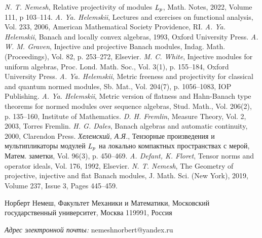 \documentclass[12pt]{article}
\begin{document}
\begin{thebibliography}{999}
    \textit{N. T. Nemesh}, Relative projectivity of 
    modules $\it{L_p}$, Math. Notes, 2022, Volume 111, p 103--114.
    \textit{A. Ya. Helemskii}, Lectures and 
    exercises on functional analysis, Vol. 233, {2006}, 
    American Mathematical Society Providence, RI.
    \textit{A. Ya. Helemskii}, Banach and locally 
    convex algebras, {1993}, Oxford University Press.
    \textit{A. W. M. Graven}, Injective and 
    projective Banach modules, Indag. Math. (Proceedings), Vol. 82, p. 253--272,
    Elsevier.
    \textit{M. C. White}, Injective modules for uniform 
    algebras, Proc. Lond. Math. Soc., Vol. 3(1), p. 155--184, Oxford University 
    Press.
    \textit{A. Ya. Helemskii}, Metric freeness and 
    projectivity for classical and quantum normed modules, Sb. Mat., 
    Vol. 204(7), p. 1056--1083, IOP Publishing.
    \textit{A. Ya. Helemskii}, Metric version of 
    flatness and Hahn-Banach type theorems for normed modules over sequence 
    algebras, Stud. Math., Vol. 206(2), p. 135--160, Institute of Mathematics.
    \textit{D. H. Fremlin}, Measure Theory, Vol. 2,
    {2003}, Torres Fremlin.
    \textit{H. G. Dales}, Banach algebras and 
    automatic continuity, {2000}, Clarendon Press.
    \textit{Хелемский, А.Я.}, Тензорные 
    произведения и мультипликаторы модулей $\it{L_p}$ на локально компактных 
    пространствах с мерой, Матем. заметки, Vol. 96(3), p. 450--469.
    \textit{A. Defant, K. Floret}, Tensor norms and 
    operator ideals, Vol. 176, {1992}, Elsevier.
    \textit{N. T. Nemesh}, The Geometry of 
    projective, injective and flat Banach modules, J. Math. Sci. (New York), 
    2019, Volume 237, Issue 3, Pages 445–459.
\end{thebibliography}

Норберт Немеш, Факультет Механики и Математики, Московский государственный 
университет, Москва 119991, Россия

\textit{Адрес электронной почты:} nemeshnorbert@yandex.ru
\end{document}

